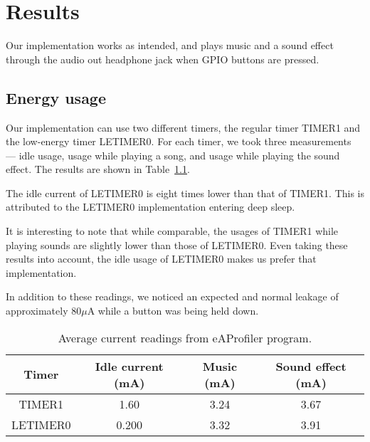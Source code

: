 \chapter{Results}
Our implementation works as intended, and plays music and a sound effect through the audio out headphone jack when GPIO buttons are pressed.

\section{Energy usage}
Our implementation can use two different timers, the regular timer TIMER1 and the low-energy timer LETIMER0. For each timer, we took three measurements --- idle usage, usage while playing a song, and usage while playing the sound effect. The results are shown in Table~\ref{tab:current}.

The idle current of LETIMER0 is eight times lower than that of TIMER1. This is attributed to the LETIMER0 implementation entering deep sleep.

It is interesting to note that while comparable, the usages of TIMER1 while playing sounds are slightly lower than those of LETIMER0. Even taking these results into account, the idle usage of LETIMER0 makes us prefer that implementation.

In addition to these readings, we noticed an expected and normal leakage of approximately 80$\mu$A while a button was being held down.

\begin{table}
\centering
\begin{tabular}{cccc}
Timer & Idle current (mA) & Music (mA) & Sound effect (mA) \\\hline
TIMER1 & 1.60 & 3.24 & 3.67 \\
LETIMER0 & 0.200 & 3.32 & 3.91 
\end{tabular}
\caption{Average current readings from eAProfiler program.}
\label{tab:current}
\end{table}